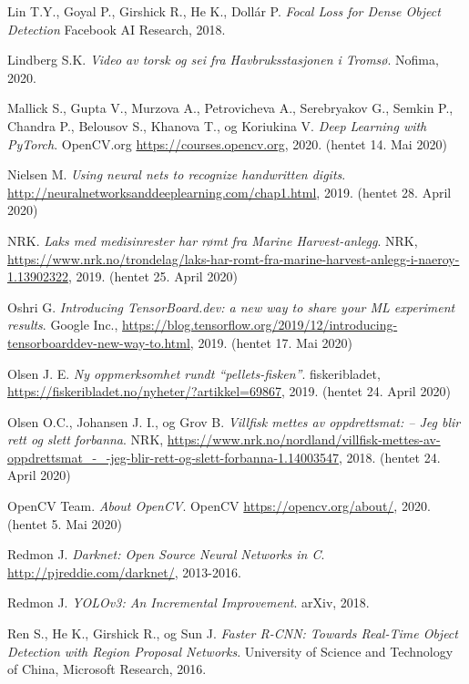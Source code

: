 \documentclass[11ot]{article}
\begin{document}
\begin{thebibliography}{9}
Lin T.Y., Goyal P., Girshick R., He K., Dollár P.
\textit{Focal Loss for Dense Object Detection}
Facebook AI Research, 2018.

Lindberg S.K. 
\textit{Video av torsk og sei fra Havbruksstasjonen i Tromsø}. 
Nofima, 2020.

Mallick S., Gupta V., Murzova A., Petrovicheva A., Serebryakov G., Semkin P., Chandra P., Belousov S., Khanova T., og Koriukina V.
\textit{Deep Learning with PyTorch}. 
OpenCV.org \url{https://courses.opencv.org}, 2020. (hentet 14. Mai 2020)

Nielsen M. 
\textit{Using neural nets to recognize handwritten digits}. 
\url{http://neuralnetworksanddeeplearning.com/chap1.html}, 2019. (hentet 28. April 2020)

NRK. 
\textit{Laks med medisinrester har rømt fra Marine Harvest-anlegg}. 
NRK, \url{https://www.nrk.no/trondelag/laks-har-romt-fra-marine-harvest-anlegg-i-naeroy-1.13902322}, 2019. (hentet 25. April 2020)

Oshri G. 
\textit{Introducing TensorBoard.dev: a new way to share your ML experiment results}. 
Google Inc., \url{https://blog.tensorflow.org/2019/12/introducing-tensorboarddev-new-way-to.html}, 2019. (hentet 17. Mai 2020)

Olsen J. E. 
\textit{Ny oppmerksomhet rundt “pellets-fisken”}. 
fiskeribladet, \url{https://fiskeribladet.no/nyheter/?artikkel=69867}, 2019. (hentet 24. April 2020)

Olsen O.C., Johansen J. I., og Grov B. 
\textit{Villfisk mettes av oppdrettsmat: – Jeg blir rett og slett forbanna}. 
NRK, \url{https://www.nrk.no/nordland/villfisk-mettes-av-oppdrettsmat_-_-jeg-blir-rett-og-slett-forbanna-1.14003547}, 2018. (hentet 24. April 2020)

OpenCV Team. 
\textit{About OpenCV}. 
OpenCV \url{https://opencv.org/about/}, 2020. (hentet 5. Mai 2020)

Redmon J. 
\textit{Darknet: Open Source Neural Networks in C}. 
\url{http://pjreddie.com/darknet/}, 2013-2016.

Redmon J. 
\textit{YOLOv3: An Incremental Improvement}. 
arXiv, 2018.

Ren S., He K., Girshick R., og Sun J.
\textit{Faster R-CNN: Towards Real-Time Object Detection with Region Proposal Networks}. 
University of Science and Technology of China, Microsoft Research, 2016.


\end{thebibliography}
\end{document}
